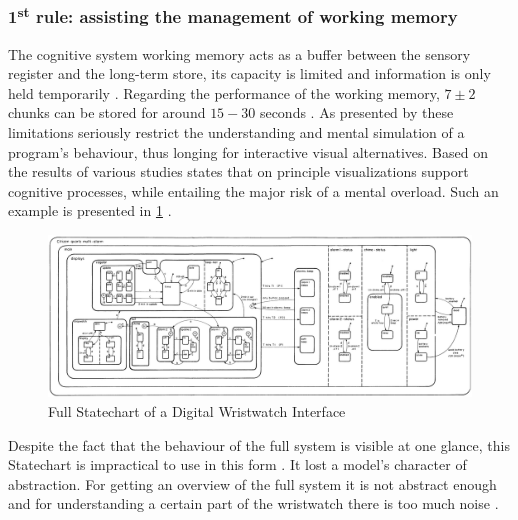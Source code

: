 \subsubsection{1\textsuperscript{st} rule: assisting the management of working memory}
The cognitive system working memory acts as a buffer between the sensory register and the long-term store, its capacity is limited and information is only held temporarily \autocite{herczeg_software-ergonomie_2018}.
Regarding the performance of the working memory, $7 \pm 2$ chunks can be stored for around $15-30$ seconds \autocite{herczeg_software-ergonomie_2018}.
As presented by \textcite{victor_inventing_2012} these limitations seriously restrict the understanding and mental simulation of a program's behaviour, thus longing for interactive visual alternatives.
Based on the results of various studies \textcite{dutke_mentale_1994} states that on principle visualizations support cognitive processes, while entailing the major risk of a mental overload.
Such an example is presented in \cref{fig:full-wristwatch-statechart} \autocite{harel_modeling_1998}.
\begin{figure}[h]
\centering
\includegraphics[width=\textwidth]{images/full-watch-statechart}
\caption{Full Statechart of a Digital Wristwatch Interface}
\label{fig:full-wristwatch-statechart}
\end{figure}
Despite the fact that the behaviour of the full system is visible at one glance, this Statechart is impractical to use in this form \autocite{harel_statecharts:_1987}.
It lost a model's character of abstraction.
For getting an overview of the full system it is not abstract enough and for understanding a certain part of the wristwatch there is too much noise \autocite{dutke_mentale_1994}.

